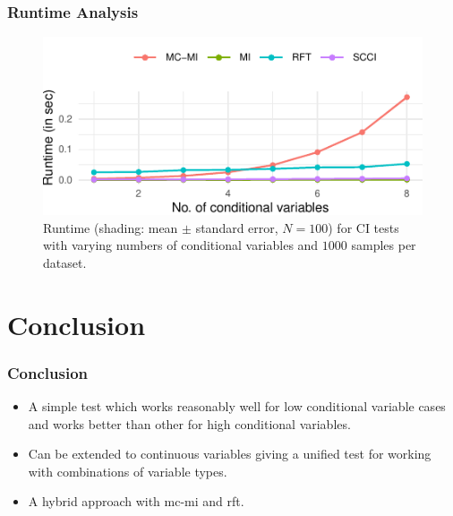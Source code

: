 \documentclass{beamer}
\begin{document}
\begin{frame}
	\frametitle{Runtime Analysis}
	\begin{figure}
		\centering
		\includegraphics{imgs/runtime.pdf}
		\caption*{Runtime (shading: mean $\pm$ standard error, $N=100$)
		for CI tests with varying numbers of conditional variables and
		$1000$ samples per dataset.
		}
	\end{figure}
\end{frame}

\section{Conclusion}
\begin{frame}
	\frametitle{Conclusion}
	\begin{itemize}
		\item A simple test which works reasonably well for low
			conditional variable cases and works better than other
			for high conditional variables.
		\item Can be extended to continuous variables giving a unified
			test for working with combinations of variable types.
		\item A hybrid approach with mc-mi and rft.
	\end{itemize}
\end{frame}

\end{document}
